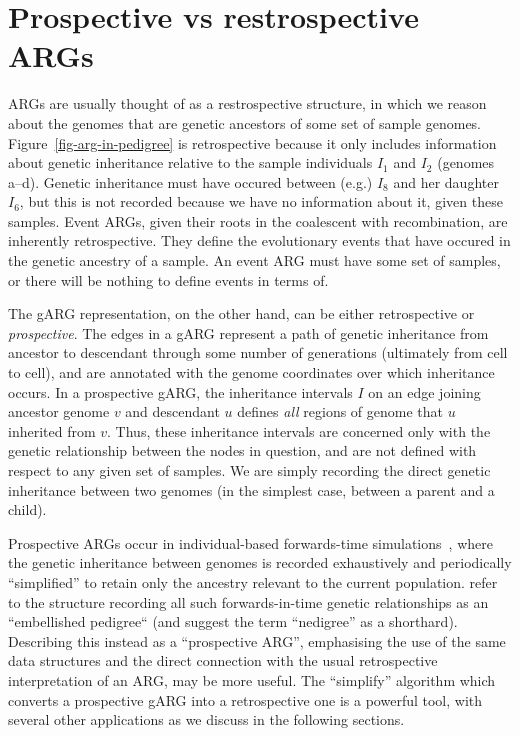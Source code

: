 \documentclass{article}
\begin{document}
\section*{Prospective vs restrospective ARGs}
ARGs are usually thought of as a restrospective structure, in which we
reason about the genomes that are genetic ancestors of some set of
sample genomes. Figure~\ref{fig-arg-in-pedigree}
is retrospective because it only includes information
about genetic inheritance relative to the sample individuals
$I_1$ and $I_2$ (genomes \textsf{a}--\textsf{d}).
Genetic inheritance must have occured between (e.g.)
$I_8$ and her daughter $I_6$, but this is not recorded because
we have no information about it, given these samples.
Event ARGs, given their roots in the coalescent with recombination,
are inherently retrospective. They define the evolutionary
events that have occured in the genetic ancestry of a sample.
An event ARG must have some set of samples, or there
will be nothing to define events in terms of.

The gARG representation, on the other hand,
can be either retrospective or \emph{prospective}.
The edges in a gARG represent a path of genetic inheritance from
ancestor to descendant through some
number of generations (ultimately from cell to cell),
and are annotated
with the genome coordinates over which inheritance occurs.
In a prospective gARG, the inheritance intervals $I$
on an edge joining ancestor genome $v$ and descendant $u$
defines \emph{all} regions of genome that $u$ inherited from $v$.
Thus, these  inheritance intervals are
concerned only with the genetic relationship
between the nodes in question, and are not defined with respect
to any given set of samples. We are simply recording the
direct genetic inheritance between two genomes
(in the simplest case, between a parent and a child).

Prospective ARGs occur in individual-based forwards-time
simulations~\citep{kelleher2018efficient,haller2018tree},
where the genetic inheritance between genomes is recorded
exhaustively and periodically
``simplified'' to retain only
the ancestry relevant to the current population.
\citet{kelleher2018efficient} refer to the structure
recording all such forwards-in-time genetic relationships
as an ``embellished pedigree`` (and suggest the term ``nedigree''
as a shorthard).
Describing this instead as a ``prospective ARG'', emphasising
the use of the same data structures and the direct connection with
the usual retrospective interpretation of an ARG, may be
more useful.
The ``simplify'' algorithm which converts a prospective
gARG into a retrospective one is a powerful tool,
with several other applications
as we discuss in the following sections.
\end{document}
